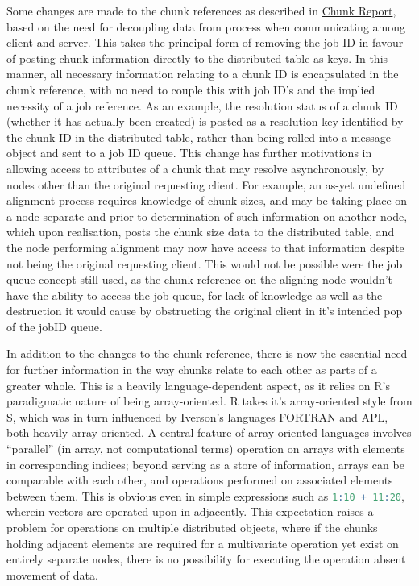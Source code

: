 \documentclass[a4paper,10pt]{article}
\begin{document}
Some changes are made to the chunk references as described in
\href{chunk-report.pdf}{Chunk Report}, based on the need for decoupling data
from process when communicating among client and server.
This takes the principal form of removing the job ID in favour of posting chunk
information directly to the distributed table as keys.
In this manner, all necessary information relating to a chunk ID is
encapsulated in the chunk reference, with no need to couple this with job ID's
and the implied necessity of a job reference.
As an example, the resolution status of a chunk ID (whether it has actually
been created) is posted as a resolution key identified by the chunk ID in the
distributed table, rather than being rolled into a message object and sent to a
job ID queue.
This change has further motivations in allowing access to attributes of a chunk
that may resolve asynchronously, by nodes other than the original requesting
client.
For example, an as-yet undefined alignment process requires knowledge of chunk
sizes, and may be taking place on a node separate and prior to determination of
such information on another node, which upon realisation, posts the chunk size
data to the distributed table, and the node performing alignment may now have
access to that information despite not being the original requesting client.
This would not be possible were the job queue concept still used, as the chunk
reference on the aligning node wouldn't have the ability to access the job
queue, for lack of knowledge as well as the destruction it would cause by
obstructing the original client in it's intended pop of the jobID queue.

In addition to the changes to the chunk reference, there is now the essential
need for further information in the way chunks relate to each other as parts of
a greater whole.
This is a heavily language-dependent aspect, as it relies on R's paradigmatic
nature of being array-oriented.
R takes it's array-oriented style from S, which was in turn influenced by
Iverson's languages FORTRAN and APL, both heavily
array-oriented\cite{becker1994shistory}\cite{iverson2007notation}.
A central feature of array-oriented languages involves ``parallel'' (in array,
not computational terms) operation on arrays with elements in corresponding
indices; beyond serving as a store of information, arrays can be comparable
with each other, and operations performed on associated elements between them.
This is obvious even in simple expressions such as 
\lstinline[language=R]{1:10 + 11:20}, wherein vectors are operated upon in
adjacently.
This expectation raises a problem for operations on multiple distributed
objects, where if the chunks holding adjacent elements are required for a
multivariate operation yet exist on entirely separate nodes, there is no
possibility for executing the operation absent movement of data.
\end{document}
